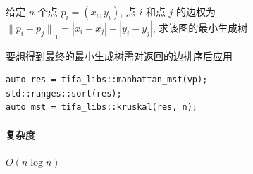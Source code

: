 给定 \(n\) 个点 \(p_i=(x_i,y_i)\), 点 \(i\) 和点 \(j\) 的边权为 \({\lVert p_i-p_j\rVert}_1=|x_i-x_j|+|y_i-y_j|\), 求该图的最小生成树

要想得到最终的最小生成树需对返回的边排序后应用 

\begin{verbatim}
auto res = tifa_libs::manhattan_mst(vp);
std::ranges::sort(res);
auto mst = tifa_libs::kruskal(res, n);
\end{verbatim}

\paragraph{复杂度} \(O(n\log n)\)

